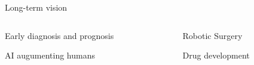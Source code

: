 \documentclass[8pt,xcolor=table]{beamer}
\begin{document}
\begin{frame}{Long-term vision}



\begin{columns}[t]
\begin{column}{0.5\textwidth}
\centering


Early diagnosis and prognosis

AI augumenting humans\\




\end{column}
\begin{column}{0.5\textwidth}
\centering


Robotic Surgery

\vo

Drug development


\end{column}
\end{columns}




\end{frame}
\end{document}
